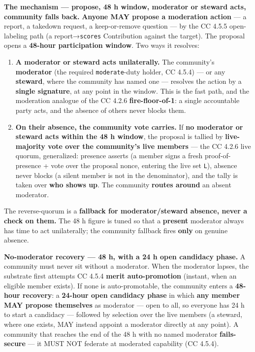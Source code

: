 \documentclass[11pt]{article}
\begin{document}
\textbf{The mechanism — propose, 48 h window, moderator or steward acts, community falls back.} \textbf{Anyone MAY propose a moderation action} — a report, a takedown request, a keep-or-remove question — by the CC 4.5.5 open-labeling path (a report→\texttt{scores} Contribution against the target). The proposal opens a \textbf{48-hour participation window}. Two ways it resolves:


\begin{enumerate}\setlength\itemsep{0pt}
\item \textbf{A moderator or steward acts unilaterally.} The community's \textbf{moderator} (the required \texttt{moderate}-duty holder, CC 4.5.4) — or any \textbf{steward}, where the community has named one — resolves the action by a \textbf{single signature}, at any point in the window. This is the fast path, and the moderation analogue of the CC 4.2.6 \textbf{fire-floor-of-1}: a single accountable party acts, and the absence of others never blocks them.
\item \textbf{On their absence, the community vote carries.} If \textbf{no moderator or steward acts within the 48 h window}, the proposal is tallied by \textbf{live-majority vote over the community's live members} — the CC 4.2.6 live quorum, generalized: presence asserts (a member signs a fresh proof-of-presence + vote over the proposal nonce, entering the live set \texttt{L}), absence never blocks (a silent member is not in the denominator), and the tally is taken over \textbf{who shows up}. The community \textbf{routes around} an absent moderator.
\end{enumerate}


The reverse-quorum is a \textbf{fallback for moderator/steward absence, never a check on them.} The 48 h figure is tuned so that a \textbf{present} moderator always has time to act unilaterally; the community fallback fires \textbf{only} on genuine absence.


\textbf{No-moderator recovery — 48 h, with a 24 h open candidacy phase.} A community must never sit without a moderator. When the moderator lapses, the substrate first attempts CC 4.5.4 \textbf{merit auto-promotion} (instant, when an eligible member exists). If none is auto-promotable, the community enters a \textbf{48-hour recovery}: a \textbf{24-hour open candidacy phase} in which \textbf{any member MAY propose themselves} as moderator — open to all, so everyone has 24 h to start a candidacy — followed by selection over the live members (a steward, where one exists, MAY instead appoint a moderator directly at any point). A community that reaches the end of the 48 h with no named moderator \textbf{fails-secure} — it MUST NOT federate at moderated capability (CC 4.5.4).
\end{document}
